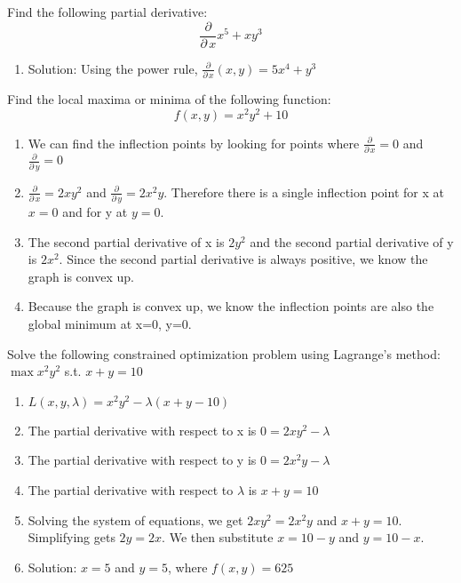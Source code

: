 \documentclass[10pt]{article}
\newenvironment{problem}[2][Problem]{\begin{trivlist}
\item[\hskip \labelsep {\bfseries #1}\hskip \labelsep {\bfseries #2.}]}{\end{trivlist}}
\begin{document}
\begin{problem}{3.10}
Find the following partial derivative:
$$\frac{\partial}{\partial \, x} x^5+xy^3$$

\begin{enumerate}
    \item Solution: Using the power rule, $\frac{\partial}{\partial \, x}(x,y) = 5x^4+y^3$
\end{enumerate}
\end{problem}

\begin{problem}{3.11}
Find the local maxima or minima of the following function:
$$f(x,y)=x^2y^2+10$$

\begin{enumerate}
    \item We can find the inflection points by looking for points where $\frac{\partial}{\partial \, x} = 0$ and $\frac{\partial}{\partial \, y} = 0$
    \item $\frac{\partial}{\partial \, x} = 2xy^2$ and $\frac{\partial}{\partial \, y} = 2x^2y$. Therefore there is a single inflection point for x at $x = 0$ and for y at $y = 0$.
    \item The second partial derivative of x is $2y^2$ and the second partial derivative of y is $2x^2$. Since the second partial derivative is always positive, we know the graph is convex up.
    \item Because the graph is convex up, we know the inflection points are also the global minimum at x=0, y=0.
\end{enumerate}
\end{problem}

\begin{problem}{3.12}
Solve the following constrained optimization problem using Lagrange's method:
$\max x^2y^2$ s.t. $x+y=10$

\begin{enumerate}
    \item $L(x,y, \lambda) =  x^2y^2 - \lambda(x + y - 10)$
    \item The partial derivative with respect to x is $0 = 2xy^2 - \lambda$
    \item The partial derivative with respect to y is $0 = 2x^2y - \lambda$
    \item The partial derivative with respect to $\lambda$ is $x + y = 10$
    \item Solving the system of equations, we get $2xy^2 = 2x^2y$ and $x + y = 10$. Simplifying gets $2y = 2x$. We then substitute $x = 10 - y$ and $y = 10 - x$.
    \item Solution: $x = 5$ and $y = 5$, where $f(x,y) = 625$
    
\end{enumerate}
\end{problem}
\end{document}
